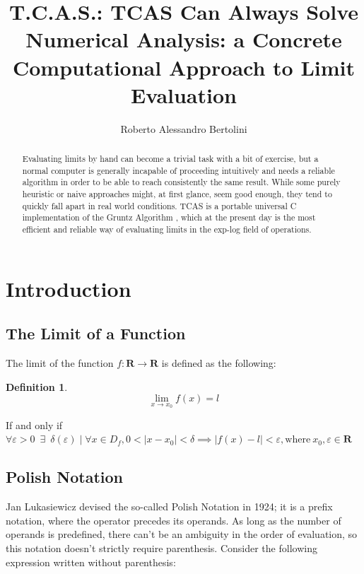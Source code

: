 \documentclass{article}
\title{\textbf{T.C.A.S.}: \textbf{T}CAS \textbf{C}an \textbf{A}lways \textbf{S}olve \\
	\large Numerical Analysis: a Concrete Computational Approach to Limit Evaluation}
\author{Roberto Alessandro Bertolini}
\date{}
\affil{Liceo Nervi Ferrari - Morbegno}
\theoremstyle{plain}
\theoremstyle{definition}
\newtheorem*{defn*}{Definition}
\theoremstyle{algorithm}
\begin{document}
	\maketitle
	
	\begin{abstract}
		Evaluating limits by hand can become a trivial task with a bit of exercise, but a normal computer is generally incapable of proceeding intuitively and needs a reliable algorithm in order to be able to reach consistently the same result. 
		While some purely heuristic or naive approaches might, at first glance, seem good enough, they tend to quickly fall apart in real world conditions. TCAS is a portable universal C implementation of the Gruntz Algorithm \cite{gruntz}, which at the present day is the most efficient and reliable way of evaluating limits in the exp-log field of operations.
	\end{abstract}
	
	\tableofcontents
	
	\newpage	
	
	\section{Introduction}
	
	\subsection{The Limit of a Function}
	
	The limit of the function $ f: \mathbf{R} \rightarrow \mathbf{R} $ is defined as the following:
	
	\begin{defn*}
		\[ 
		\lim_{x \to x_{0}}{f(x) = l} 
		\]
		
		If and only if \( 
		\forall \varepsilon > 0 \enspace \exists \enspace \delta(\varepsilon) \mid \forall x \in D_{f}, 0 < \mid x - x_{0} \mid < \delta \implies \mid f(x) - l \mid < \varepsilon, \text{where} \: x_{0}, \varepsilon \in \mathbf{R}
		\)
	\end{defn*}
	
	\subsection{Polish Notation} \label{sec:pn}
	
	Jan Lukasiewicz devised the so-called Polish Notation \cite{wiki:polish} in 1924; it is a prefix notation, where the operator precedes its operands.
	As long as the number of operands is predefined, there can't be an ambiguity in the order of evaluation, so this notation doesn't strictly require parenthesis.
	Consider the following expression written without parenthesis:
	
\end{document}
